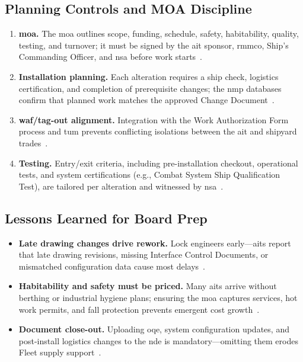 \documentclass[../main.tex]{subfiles}
\begin{document}
\subsection{Planning Controls and MOA Discipline}
\begin{enumerate}
  \item \textbf{\ac{moa}.} The \ac{moa} outlines scope, funding, schedule, safety, habitability, quality, testing, and turnover; it must be signed by the \ac{ait} sponsor, \ac{rmmco}, Ship's Commanding Officer, and \ac{nsa} before work starts~\autocite{TS9090-310}.
  \item \textbf{Installation planning.} Each alteration requires a ship check, logistics certification, and completion of prerequisite changes; the \ac{nmp} databases confirm that planned work matches the approved Change Document~\autocite{SL720-AA-MAN-030}.
  \item \textbf{\ac{waf}/tag-out alignment.} Integration with the Work Authorization Form process and \ac{tum} prevents conflicting isolations between the \ac{ait} and shipyard trades~\autocite{S0400-AD-URM-010}.
  \item \textbf{Testing.} Entry/exit criteria, including pre-installation checkout, operational tests, and system certifications (e.g., Combat System Ship Qualification Test), are tailored per alteration and witnessed by \ac{nsa}~\autocite{TS9090-310}.
\end{enumerate}

\subsection{Lessons Learned for Board Prep}
\begin{itemize}
  \item \textbf{Late drawing changes drive rework.} Lock engineers early—\acp{ait} report that late drawing revisions, missing Interface Control Documents, or mismatched configuration data cause most delays~\autocite{edo-4-1-4-ait-fundamentals-2025}.
  \item \textbf{Habitability and safety must be priced.} Many \acp{ait} arrive without berthing or industrial hygiene plans; ensuring the \ac{moa} captures services, hot work permits, and fall protection prevents emergent cost growth~\autocite{SL720-AA-MAN-030}.
  \item \textbf{Document close-out.} Uploading \ac{oqe}, system configuration updates, and post-install logistics changes to the \ac{nde} is mandatory—omitting them erodes Fleet supply support~\autocite{TS9090-310}.
\end{itemize}

\end{document}

